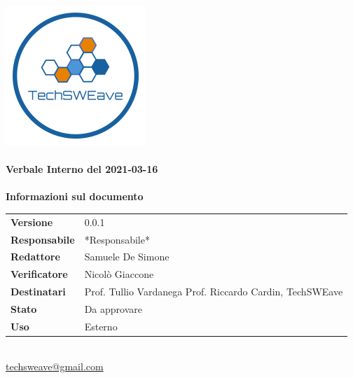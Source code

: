 \documentclass[a4paper]{article}
\begin{document}
\begin{titlepage}
    \begin{center}
        \includegraphics{../../../../Images/logo}\\
        \vspace{20px}
        \textcolor{logo}{\hrulefill}\\
        \vspace{20px}
        \textbf{\huge\textcolor{logo}{Verbale Interno del 2021-03-16}}\\
        \vspace{10px}
        \textcolor{logo}{\hrulefill}\\
        \vspace{40px}
        \textbf{\Large Informazioni sul documento}\\
        \vspace{20px}
        \begin{tabular}{p{100px} | p{100px}}
            \textbf{Versione} & 0.0.1\\
            \textbf{Responsabile} & *Responsabile*\\
            \textbf{Redattore} & Samuele De Simone\\
            \textbf{Verificatore} & Nicolò Giaccone\\
            \textbf{Destinatari} & Prof. Tullio Vardanega \newline Prof. Riccardo Cardin, \newline TechSWEave\\
            \textbf{Stato} & Da approvare\\
            \textbf{Uso} & Esterno\\
        \end{tabular}\\
        \vspace{60px}
        \href{mailto:techsweave@gmail.com}{techsweave@gmail.com}\\

    \end{center}
    \end{titlepage}
\end{document}
